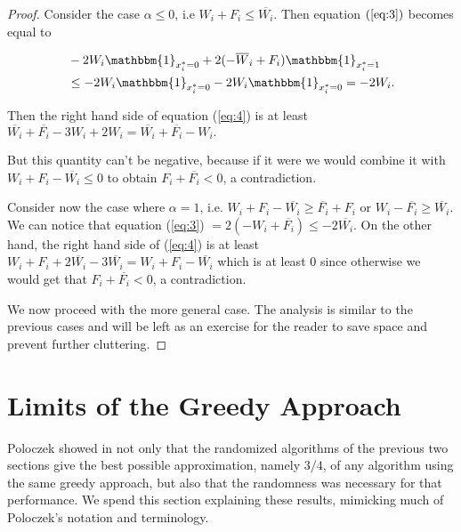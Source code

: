 \documentclass[11pt,letter]{article}
\numberwithin{theorem}{section}
\begin{document}
\begin{proof}
Consider the case $\alpha \leq 0$, i.e $W_i + F_i \leq \overline{W_i}$. Then equation $(\ref{eq:3})$ becomes equal to

\begin{equation*}
\begin{aligned}
& -2W_i \mathbbm{1}_{x_i^* = 0} + 2(-\overline{W}_i + F_i) \mathbbm{1}_{x_i^* = 1} \\ 
& \leq  -2W_i \mathbbm{1}_{x_i^* = 0} - 2W_i \mathbbm{1}_{x_i^* = 0} = -2W_i.
\end{aligned}
\end{equation*}

Then the right hand side of equation (\ref{eq:4}) is at least $\overline{W_i} + \overline{F_i} - 3W_i + 2W_i =
\overline{W_i} + \overline{F_i} - W_i.$

But this quantity can't be negative, because if it were we would combine it with $W_i + F_i - \overline{W_i} \leq 0$ to obtain $F_i +
\overline{F_i} < 0$, a contradiction.

Consider now the case where $\alpha = 1$, i.e. $W_i + F_i -\overline{W_i} \geq \overline{F_i} + F_i$ or $W_i - \overline{F_i} \geq \overline{W_i}$.
We can notice that equation (\ref{eq:3}) $= 2(-W_i + \overline{F_i}) \leq -2\overline{W_i}$. On the other hand, the right hand side of  (\ref{eq:4})
is at least $W_i + F_i + 2\overline{W_i} -3\overline{W_i} = W_i + F_i - \overline{W_i}$ which is at least $0$ since otherwise we would get
that $F_i + \overline{F_i} < 0$, a contradiction.

We now proceed with the more general case. The analysis is similar to the previous cases and will be left as an exercise
for the reader to save space and prevent further cluttering.

\end{proof}


\section{Limits of the Greedy Approach}\label{S:limits}

Poloczek showed in \cite{DBLP:conf/esa/Poloczek11} not only that
the randomized algorithms of the previous two sections
give the best possible approximation, namely $3/4$,
of any algorithm using the same greedy approach,
but also that the randomness was necessary for that performance.
We spend this section explaining these results,
mimicking much of Poloczek's notation and terminology.
\end{document}
